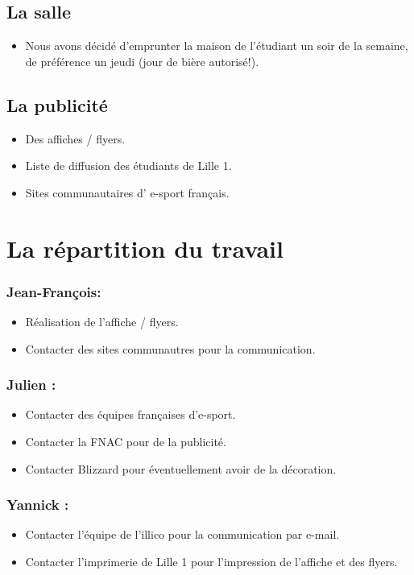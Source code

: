 \subsection{La salle}
\begin{itemize}
\item Nous avons décidé d'emprunter la maison de l'étudiant un soir de la semaine, de préférence un jeudi (jour de bière autorisé!).
\end{itemize}

\subsection{La publicité}
\begin{itemize}
\item Des affiches / flyers.
\item Liste de diffusion des étudiants de Lille 1.
\item Sites communautaires d' \og e-sport \fg{} français.
\end{itemize}

\section{La répartition du travail}

\subsubsection{Jean-François:}
\begin{itemize}
\item Réalisation de l'affiche / flyers.
\item Contacter des sites communautres pour la communication.
\end{itemize}

\subsubsection{Julien :}
\begin{itemize}
\item Contacter des équipes françaises d'e-sport.
\item Contacter la FNAC pour de la publicité.
\item Contacter Blizzard pour éventuellement avoir de la décoration.
\end{itemize}

\subsubsection{Yannick :}
\begin{itemize}
\item Contacter l'équipe de l'illico pour la communication par e-mail.
\item Contacter l'imprimerie de Lille 1 pour l'impression de l'affiche et des flyers.
\end{itemize}
